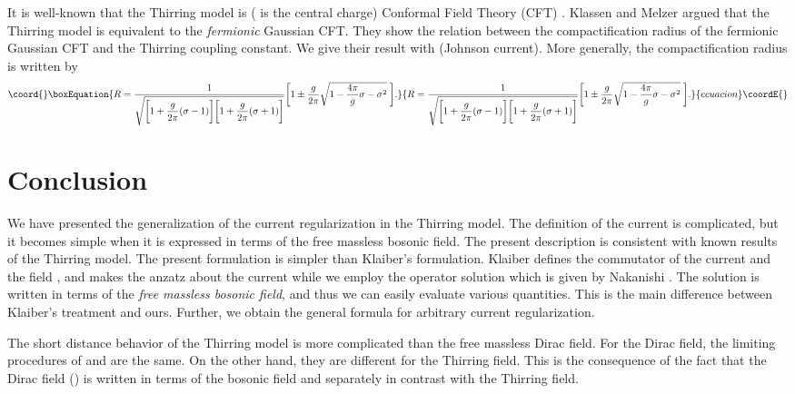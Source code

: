 \documentclass[a4paper,fleqn]{article}
\begin{document}
It is well-known that the Thirring model is \coordHE{} (\coordHE{} is the central charge)
 Conformal Field Theory (CFT) \cite{fer_gri_gat72}. Klassen and Melzer \cite{kla_mel93}
argued that the Thirring model is equivalent to the {\it fermionic} Gaussian CFT.
They show the relation between the compactification radius of the fermionic Gaussian CFT 
and the Thirring coupling constant. We give their result with \coordHE{} (Johnson current).
More generally, the compactification radius \coordHE{} is written by
\begin{equation}\coord{}\boxEquation{
R = \frac{1}{\sqrt{\biggl[1+ \displaystyle\frac{g}{2 \pi}(\sigma-1)\biggr]
                   \biggl[1+ \displaystyle\frac{g}{2 \pi}(\sigma+1)\biggr]}}\biggl[
      1 \pm \frac{g}{2 \pi} \sqrt{1-\frac{4 \pi}{g} \sigma - \sigma^2} \;\biggr] .
}{
R = \frac{1}{\sqrt{\biggl[1+ \displaystyle\frac{g}{2 \pi}(\sigma-1)\biggr]
                   \biggl[1+ \displaystyle\frac{g}{2 \pi}(\sigma+1)\biggr]}}\biggl[
      1 \pm \frac{g}{2 \pi} \sqrt{1-\frac{4 \pi}{g} \sigma - \sigma^2} \;\biggr] .
}{ecuacion}\coordE{}\end{equation}

\newpage
\section{Conclusion}
We have presented the generalization of the current regularization in the Thirring model.
The definition of the current is complicated, 
but it becomes simple when it is expressed in terms of the free massless bosonic field.
The present description is consistent with known results of the Thirring model.
The present formulation is simpler than Klaiber's formulation. 
Klaiber defines the commutator of the current \coordHE{} and the field \myHighlight{$\psi$}\coordHE{},
and makes the anzatz about the current while we employ
the operator solution which is given by Nakanishi \cite{nak77}.
 The solution is written in terms of the {\it free massless bosonic field}, and thus
we can easily evaluate various quantities. This is the main difference between Klaiber's
treatment and ours. Further, we obtain the general formula for arbitrary current regularization.

The short distance behavior of the Thirring model is more complicated than the free massless
Dirac field. For the Dirac field, the limiting procedures of \coordHE{}
and \coordHE{} are the same. On the other hand, they are different
for the Thirring field. This is the consequence of the fact that the Dirac
field (\coordHE{}) is written in terms of the bosonic field \coordHE{} and 
\coordHE{} separately in contrast with the Thirring field. 
\end{document}
